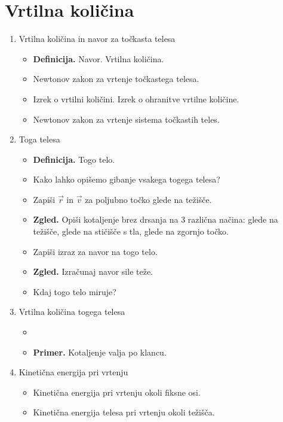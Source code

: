 \section{Vrtilna količina}
\begin{enumerate}
    \item Vrtilna količina in navor za točkasta telesa
    \begin{itemize}
        \item \textbf{Definicija.} Navor. Vrtilna količina.
        \item Newtonov zakon za vrtenje točkastega telesa.
        \item Izrek o vrtilni količini. Izrek o ohranitve vrtilne količine.
        \item Newtonov zakon za vrtenje sistema točkastih teles.
    \end{itemize}

    \item Toga telesa
    \begin{itemize}
        \item \textbf{Definicija.} Togo telo.
        \item Kako lahko opišemo gibanje vsakega togega telesa?
        \item Zapiši \(\vec{r}\) in \(\vec{v}\) za poljubno točko glede na težišče.
        \item \textbf{Zgled.} Opiši kotaljenje brez drsanja na 3 različna načina: glede na težišče, glede na stičišče s tla, glede na zgornjo točko. 
        \item Zapiši izraz za navor na togo telo.
        \item \textbf{Zgled.} Izračunaj navor sile teže.
        \item Kdaj togo telo miruje?
    \end{itemize}

    \item Vrtilna količina togega telesa
    \begin{itemize}
        \item {}
        \item \textbf{Primer.} Kotaljenje valja po klancu.
    \end{itemize}

    \item Kinetična energija pri vrtenju
    \begin{itemize}
        \item Kinetična energija pri vrtenju okoli fiksne osi.
        \item Kinetična energija telesa pri vrtenju okoli težišča.
    \end{itemize}
\end{enumerate}

